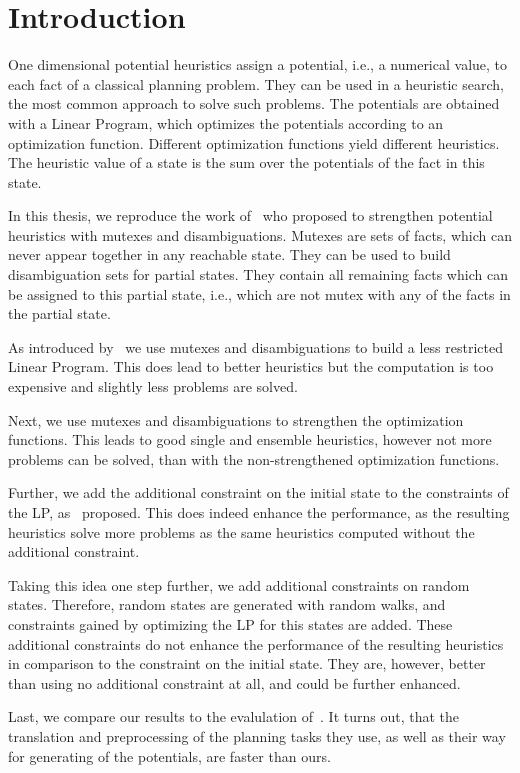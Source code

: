 \chapter{Introduction}\label{ch:introduction}

One dimensional potential heuristics assign a potential, i.e., a numerical value, to each fact of a classical planning problem.
They can be used in a heuristic search, the most common approach to solve such problems.
The potentials are obtained with a Linear Program, which optimizes the potentials according to an optimization function.
Different optimization functions yield different heuristics.
The heuristic value of a state is the sum over the potentials of the fact in this state.

In this thesis, we reproduce the work of~\cite{fivser2020strengthening} who proposed to strengthen potential heuristics with mutexes and disambiguations.
Mutexes are sets of facts, which can never appear together in any reachable state.
They can be used to build disambiguation sets for partial states.
They contain all remaining facts which can be assigned to this partial state, i.e., which are not mutex with any of the facts in the partial state.

As introduced by~\cite{fivser2020strengthening} we use mutexes and disambiguations to build a less restricted Linear Program.
This does lead to better heuristics but the computation is too expensive and slightly less problems are solved.

Next, we use mutexes and disambiguations to strengthen the optimization functions.
This leads to good single and ensemble heuristics, however not more problems can be solved, than with the non-strengthened optimization functions.

Further, we add the additional constraint on the initial state to the constraints of the LP, as~\cite{fivser2020strengthening} proposed.
This does indeed enhance the performance, as the resulting heuristics solve more problems as the same heuristics computed without the additional constraint.

Taking this idea one step further, we add additional constraints on random states.
Therefore, random states are generated with random walks, and constraints gained by optimizing the LP for this states are added.
These additional constraints do not enhance the performance of the resulting heuristics in comparison to the constraint on the initial state.
They are, however, better than using no additional constraint at all, and could be further enhanced.

Last, we compare our results to the evalulation of~\cite{fivser2020strengthening}.
It turns out, that the translation and preprocessing of the planning tasks they use, as well as their way for generating of the potentials, are faster than ours.